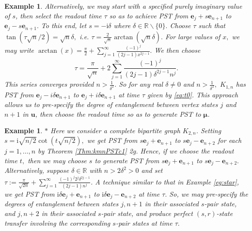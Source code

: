 \documentclass{article}
\numberwithin{equation}{section}
\newtheorem{ex}[lemma]{Example}
\newcommand{\be}{\mathbf e}
\newcommand{\bu}{\mathbf u}
\newcommand{\bmu}{{\boldsymbol{\mu}}}
\def\R{\mathbb{R}}
\def\ii{\mathrm{i}}
\begin{document}
{\begin{ex}
{Alternatively, we may start with a specified purely imaginary value of $s$, then select the readout time $\tau$ so as to achieve PST from $\be_j+s\be_{n+1}$ 
to $\be_j-s\be_{n+1}.$ To this end, let $s=-\ii \delta$ where $\delta \in \R \backslash \{0\}.$ Choose $\tau$ such that $\tan\left(\tau\sqrt{n}/2\right) =\sqrt{n}\delta,$ i.e. $\tau=\frac{2}{\sqrt{n}}\arctan(\sqrt{n}\delta).$  For large values of $x,$ we may write $\arctan(x) = \frac{\pi}{2} +\sum_{j=1}^\infty\frac{(-1)^j}{(2j-1)x^{2j-1}}. $
We then choose 
\begin{equation}\label{eq:t0}
 \tau=  \frac{\pi}{\sqrt{n}} +2\sum_{j=1}^\infty\frac{(-1)^j}{(2j-1)\delta^{2j-1} n^j}. 
 \end{equation}
This series converges provided $n > \frac{1}{\delta^2}$. 
So for any real $\delta \ne 0$ and $n > \frac{1}{\delta^2},$ $K_{1,n}$ has PST from $\be_j-i\delta \be_{n+1}$ 
to $\be_j+i\delta\be_{n+1}$ at time $\tau$ given by \eqref{eq:t0}. This approach allows us to pre-specify the degree of entanglement between vertex states $j$ and $n+1$ in $\bu$, then choose the readout time so as to generate PST to $\bmu$. 
}
\end{ex}


\begin{ex}\label{eg:k2n}$*$\rm{
Here we consider a complete bipartite graph $K_{2,n}$. %
Setting $s=\ii \sqrt{n/2} \cot( t\sqrt{n/2}),$ we get PST
from $s\be_j+\be_{n+1}$ to $s\be_j-\be_{n+2}$ for each $j=1, \ldots, n$ by Theorem \ref{Thm:kmnPSTc1} 2g. Hence, if we choose the readout time $t,$ then we may choose $s$ to generate PST from $s \be_j+\be_{n+1}$ to $s \be_j-\be_{n+2}.$ Alternatively, 
suppose $\delta\in\R$ with $n> 2\delta^2>0$ and set 
$\tau:= 
 \frac{\pi}{\sqrt{2n}} +\sum_{j=1}^\infty\frac{(-1)^j 2^j\delta^{2j-1}}{(2j-1) n^j} $. A technique similar to that in Example \ref{eg:star}, 
we get PST from $\ii\delta \be_j+\be_{n+1}$ to $\ii\delta\be_j-\be_{n+2}$ 
at time $\tau.$ So, we may pre-specify the degrees of entanglement between states $j,n+1$ in their associated $s$-pair state, and $j,n+2$ in their associated $s$-pair state, and produce perfect $(s,r)$-state transfer involving the corresponding $s$-pair states 
at time $\tau.$
}
\end{ex}



}
\end{document}
